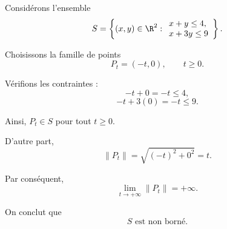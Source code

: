 \begin{exemple}
Considérons l'ensemble
\[
S=\left\{(x,y)\in\R^2:
\begin{array}{l}
x+y\leq 4,\\
x+3y\leq 9
\end{array}
\right\}.
\]

Choisissons la famille de points
\[
P_t=(-t,0),\qquad t\geq 0.
\]

Vérifions les contraintes :
\[
-t+0=-t\leq 4,
\]
\[
-t+3(0)=-t\leq 9.
\]

Ainsi, $P_t\in S$ pour tout $t\geq 0$.

D'autre part,
\[
\|P_t\|=\sqrt{(-t)^2+0^2}=t.
\]

Par conséquent,
\[
\lim_{t\to+\infty}\|P_t\|=+\infty.
\]

On conclut que
\[
\boxed{S\text{ est non borné}.}
\]
\end{exemple}
